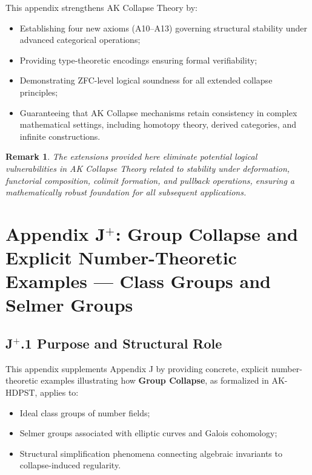\documentclass[11pt]{article}
\newtheorem{remark}[theorem]{Remark}
\begin{document}
This appendix strengthens AK Collapse Theory by:

\begin{itemize}
    \item Establishing four new axioms (A10–A13) governing structural stability under advanced categorical operations;
    \item Providing type-theoretic encodings ensuring formal verifiability;
    \item Demonstrating ZFC-level logical soundness for all extended collapse principles;
    \item Guaranteeing that AK Collapse mechanisms retain consistency in complex mathematical settings, including homotopy theory, derived categories, and infinite constructions.
\end{itemize}

\begin{remark}
The extensions provided here eliminate potential logical vulnerabilities in AK Collapse Theory related to stability under deformation, functorial composition, colimit formation, and pullback operations, ensuring a mathematically robust foundation for all subsequent applications.
\end{remark}




\section*{Appendix J$^{+}$: Group Collapse and Explicit Number-Theoretic Examples — Class Groups and Selmer Groups}

\subsection*{J$^{+}$.1 Purpose and Structural Role}

This appendix supplements Appendix J by providing concrete, explicit number-theoretic examples illustrating how \textbf{Group Collapse}, as formalized in AK-HDPST, applies to:

\begin{itemize}
    \item Ideal class groups of number fields;
    \item Selmer groups associated with elliptic curves and Galois cohomology;
    \item Structural simplification phenomena connecting algebraic invariants to collapse-induced regularity.
\end{itemize}
\end{document}
